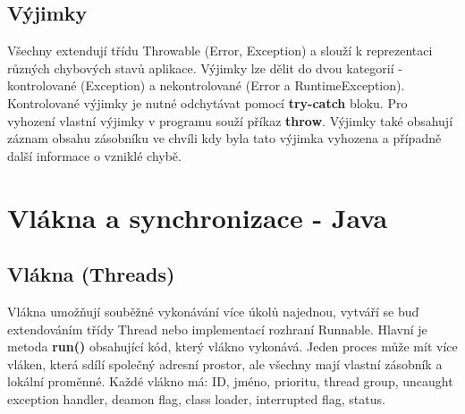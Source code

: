 \documentclass{scrreprt}
\begin{document}
\subsection{Výjimky}
Všechny extendují třídu \textsf{Throwable} (\textsf{Error}, \textsf{Exception}) a slouží k reprezentaci různých chybových stavů aplikace. Výjimky lze dělit do dvou kategorií - kontrolované (\textsf{Exception}) a nekontrolované (\textsf{Error} a \textsf{RuntimeException}). Kontrolované výjimky je nutné odchytávat pomocí \textbf{try-catch} bloku. Pro vyhození vlastní výjimky v programu souží příkaz \textbf{throw}. Výjimky také obsahují záznam obsahu zásobníku ve chvíli kdy byla tato výjimka vyhozena a případně další informace o vzniklé chybě.

\section{Vlákna a synchronizace - Java}

\subsection{Vlákna (Threads)}
Vlákna umožňují souběžné vykonávání více úkolů najednou, vytváří se buď extendováním třídy \textsf{Thread} nebo implementací rozhraní \textsf{Runnable}. Hlavní je metoda \textbf{run()} obsahující kód, který vlákno vykonává. Jeden proces může mít více vláken, která sdílí společný adresní prostor, ale všechny mají vlastní zásobník a lokální proměnné. Každé vlákno má: ID, jméno, prioritu, thread group, uncaught exception handler, deamon flag, class loader, interrupted flag, status.
\end{document}

